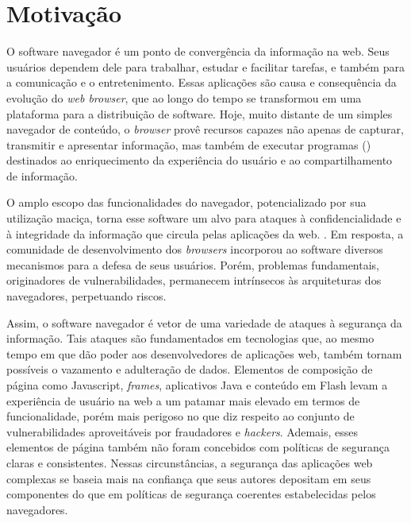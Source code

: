 \section{Motivação}


O software navegador é um ponto de convergência da informação na web. Seus usuários dependem dele para trabalhar, estudar e facilitar tarefas, e também para a comunicação e o entretenimento. Essas aplicações são causa e consequência da evolução do \textit{web browser}, que ao longo do tempo se transformou em uma plataforma para a distribuição de software. Hoje, muito distante de um simples navegador de conteúdo, o \textit{browser} provê recursos capazes não apenas de capturar, transmitir e apresentar informação, mas também de executar programas (\scripts{}) destinados ao enriquecimento da experiência do usuário e ao compartilhamento de informação.

O amplo escopo das funcionalidades do navegador, potencializado por sua utilização maciça, torna esse software um alvo para ataques à confidencialidade e à integridade da informação que circula pelas aplicações da web. . Em resposta, a comunidade de desenvolvimento dos \textit{browsers} incorporou ao software diversos mecanismos para a defesa de seus usuários. Porém, problemas fundamentais, originadores de vulnerabilidades, permanecem intrínsecos às arquiteturas dos navegadores, perpetuando riscos.

Assim, o software navegador é vetor de uma variedade de ataques à segurança da informação. Tais ataques são fundamentados em tecnologias que, ao mesmo tempo em que dão poder aos desenvolvedores de aplicações web, também tornam possíveis o vazamento e adulteração de dados. Elementos de composição de página como Javascript, \textit{frames}, aplicativos Java e conteúdo em Flash levam a experiência de usuário na web a um patamar mais elevado em termos de funcionalidade, porém mais perigoso no que diz respeito ao conjunto de vulnerabilidades aproveitáveis por fraudadores e \textit{hackers}. Ademais, esses elementos de página também não foram concebidos com políticas de segurança claras e consistentes. Nessas circunstâncias, a segurança das aplicações web complexas se baseia mais na confiança que seus autores depositam em seus componentes do que em políticas de segurança coerentes estabelecidas pelos navegadores.

